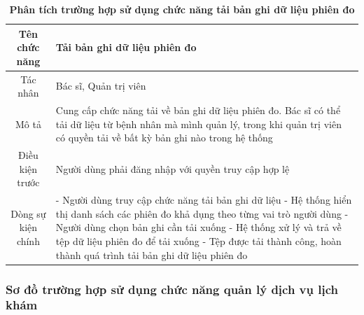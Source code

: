\begin{table}[H]
	\caption{\bfseries \fontsize{12pt}{0pt}\selectfont Phân tích trường hợp sử dụng chức năng tải bản ghi dữ liệu phiên đo}
	\centering
	\begin{tabularx}{0.9\textwidth}{|c|X|}
		\hline
		\textbf{Tên chức năng} & \textbf{Tải bản ghi dữ liệu phiên đo}                                                                                                                                                 \\
		\hline
		Tác nhân               & Bác sĩ, Quản trị viên                                                                                                                                                                 \\
		\hline
		Mô tả                  & Cung cấp chức năng tải về bản ghi dữ liệu phiên đo. Bác sĩ có thể tải dữ liệu từ bệnh nhân mà mình quản lý, trong khi quản trị viên có quyền tải về bất kỳ bản ghi nào trong hệ thống \\
		\hline
		Điều kiện trước        & Người dùng phải đăng nhập với quyền truy cập hợp lệ                                                                                                                                   \\
		\hline
		Dòng sự kiện chính     &
		- Người dùng truy cập chức năng tải bản ghi dữ liệu \newline
		- Hệ thống hiển thị danh sách các phiên đo khả dụng theo từng vai trò người dùng \newline
		- Người dùng chọn bản ghi cần tải xuống \newline
		- Hệ thống xử lý và trả về tệp dữ liệu phiên đo để tải xuống \newline
		- Tệp được tải thành công, hoàn thành quá trình tải bản ghi dữ liệu phiên đo                                                                                                                                   \\
		\hline
	\end{tabularx}
\end{table}

\subsubsection{Sơ đồ trường hợp sử dụng chức năng quản lý dịch vụ lịch khám}

